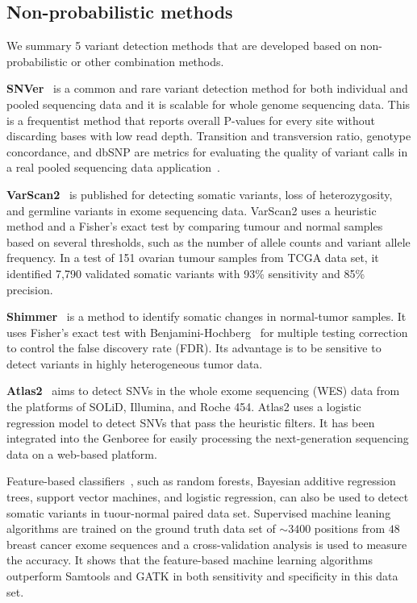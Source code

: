 \documentclass[a4,center,fleqn]{NAR}
\begin{document}
\subsection{Non-probabilistic methods}

We summary 5 variant detection methods that are developed based on non-probabilistic or other combination methods.

\textbf{SNVer}~\citep{Wei2011} is a common and rare variant detection method for both individual and pooled sequencing data and it is scalable for whole genome sequencing data.
This is a frequentist method that reports overall P-values for every site without discarding bases with low read depth.
Transition and transversion ratio, genotype concordance, and dbSNP are metrics for evaluating the quality of variant calls in a real pooled sequencing data application~\citep{depristo2011framework}.

\textbf{VarScan2}~\citep{Koboldt2012} is published for detecting somatic variants, loss of heterozygosity, and germline variants in exome sequencing data.
VarScan2 uses a heuristic method and a Fisher's exact test by comparing tumour and normal samples based on several thresholds, such as the number of allele counts and variant allele frequency.
In a test of 151 ovarian tumour samples from TCGA data set, it identified 7,790 validated somatic variants with 93\% sensitivity and 85\% precision.

\textbf{Shimmer}~\citep{Hansen2013} is a method to identify somatic changes in normal-tumor samples.
It uses Fisher's exact test with Benjamini-Hochberg~\citep{benjamini1995controlling} for multiple testing correction to control the false discovery rate (FDR).
Its advantage is to be sensitive to detect variants in highly heterogeneous tumor data.

\textbf{Atlas2}~\citep{challis2012integrative} aims to detect SNVs in the whole exome sequencing (WES) data from the platforms of SOLiD, Illumina, and Roche 454.
Atlas2 uses a logistic regression model to detect SNVs that pass the heuristic filters.
It has been integrated into the Genboree for easily processing the next-generation sequencing data on a web-based platform.

Feature-based classifiers~\citep{Ding2012}, such as random forests, Bayesian additive regression trees, support vector machines, and logistic regression, can also be used to detect somatic variants in tuour-normal paired data set.
Supervised machine leaning algorithms are trained on the ground truth data set of $\sim 3400$ positions from $48$ breast cancer exome sequences and a cross-validation analysis is used to measure the accuracy.
It shows that the feature-based machine learning algorithms outperform Samtools and GATK in both sensitivity and specificity in this data set.
\end{document}
